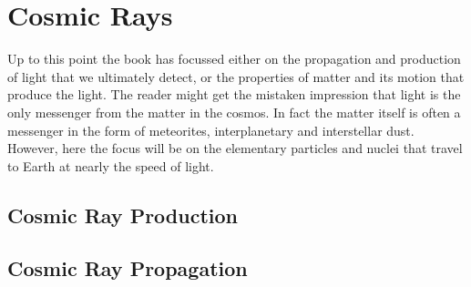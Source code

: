 \chapter{Cosmic Rays}

Up to this point the book has focussed either on the propagation and
production of light that we ultimately detect, or the properties of
matter and its motion that produce the light.  The reader might get
the mistaken impression that light is the only messenger from the
matter in the cosmos.   In fact the matter itself is often a messenger
in the form of meteorites, interplanetary and interstellar dust.
However, here the focus will be on the elementary particles and nuclei
that travel to Earth at nearly the speed of light.

\section{Cosmic Ray Production}

\section{Cosmic Ray Propagation}


